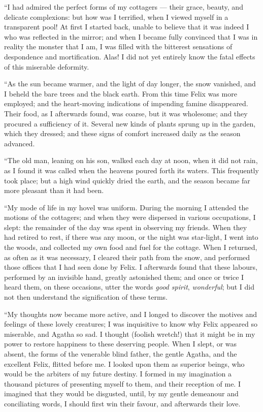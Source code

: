 ``I had admired the perfect forms of
my cottagers --- their grace, beauty, and
delicate complexions: but how was I
terrified, when I viewed myself in a
transparent pool! At first I started
back, unable to believe that it was indeed
I who was reflected in the mirror;
and when I became fully convinced
that I was in reality the monster that I
am, I was filled with the bitterest sensations
of despondence and mortification.
Alas! I did not yet entirely
know the fatal effects of this miserable
deformity.

``As the sun became warmer, and
the light of day longer, the snow
vanished, and I beheld the bare trees and
the black earth. From this time Felix
was more employed; and the heart-moving
indications of impending famine
disappeared. Their food, as I
afterwards found, was coarse, but it
was wholesome; and they procured a
sufficiency of it. Several new kinds
of plants sprung up in the garden,
which they dressed; and these signs of
comfort increased daily as the season
advanced.

``The old man, leaning on his son,
walked each day at noon, when it did
not rain, as I found it was called when
the heavens poured forth its waters.
This frequently took place; but a high
wind quickly dried the earth, and the
season became far more pleasant than
it had been.

``My mode of life in my hovel was
uniform. During the morning I attended
the motions of the cottagers;
and when they were dispersed in various
occupations, I slept: the remainder
of the day was spent in observing
my friends. When they had retired to
rest, if there was any moon, or the night
was star-light, I went into the woods,
and collected my own food and fuel
for the cottage. When I returned, as
often as it was necessary, I cleared their
path from the snow, and performed
those offices that I had seen done by
Felix. I afterwards found that these
labours, performed by an invisible
hand, greatly astonished them; and
once or twice I heard them, on these
occasions, utter the words \emph{good spirit},
\emph{wonderful}; but I did not then understand
the signification of these terms.

``My thoughts now became more
active, and I longed to discover the
motives and feelings of these lovely
creatures; I was inquisitive to know
why Felix appeared so miserable, and
Agatha so sad. I thought (foolish
wretch!) that it might be in my power
to restore happiness to these deserving
people. When I slept, or was absent,
the forms of the venerable blind father,
the gentle Agatha, and the excellent
Felix, flitted before me. I looked upon
them as superior beings, who would be
the arbiters of my future destiny. I
formed in my imagination a thousand
pictures of presenting myself to them,
and their reception of me. I imagined
that they would be disgusted, until, by
my gentle demeanour and conciliating
words, I should first win their favour,
and afterwards their love.

